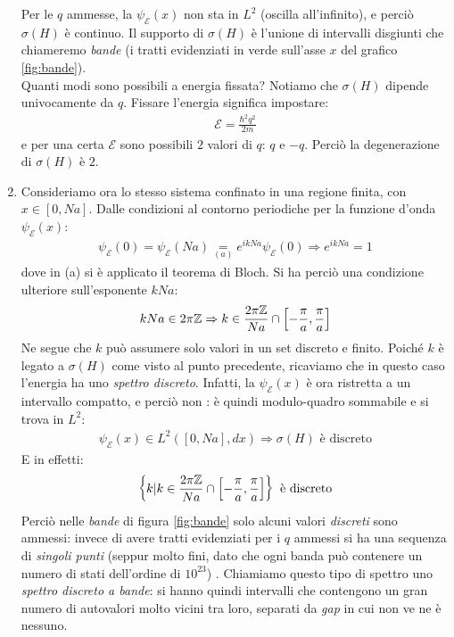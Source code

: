 \documentclass[../../FisicaTeorica.tex]{subfiles}
\begin{document}
\begin{enumerate}
Per le $q$ ammesse, la $\psi_\mathcal{E}(x)$ non sta in $L^2$ (oscilla all'infinito), e perciò $\sigma(H)$ è continuo. Il supporto di $\sigma(H)$ è l'unione di intervalli disgiunti
che chiameremo \textit{bande} (i tratti evidenziati in verde sull'asse $x$ del grafico \ref{fig:bande}).\\
Quanti modi sono possibili a energia fissata? Notiamo che $\sigma(H)$ dipende univocamente da $q$. Fissare l'energia significa impostare:
\begin{align*}
\mathcal{E} = \frac{\hbar^2 q^2}{2m}
\end{align*}
e per una certa $\mathcal{E}$ sono possibili $2$ valori di $q$: $q$ e $-q$. Perciò la degenerazione di $\sigma(H)$ è $2$.
\item Consideriamo ora lo stesso sistema confinato in una regione finita, con $x \in [0,Na]$. Dalle condizioni al contorno periodiche per la funzione d'onda $\psi_\mathcal{E}(x)$:
\begin{align*}
\psi_\mathcal{E}(0) = \psi_\mathcal{E}(Na) \underset{(a)}{=} e^{ikNa}\psi_\mathcal{E}(0) \Rightarrow e^{ikNa} = 1
\end{align*}
dove in (a) si è applicato il teorema di Bloch. Si ha perciò una condizione ulteriore sull'esponente $kNa$:
\begin{align*}
kNa \in 2\pi\mathbb{Z} \Rightarrow  k \in \frac{2\pi \mathbb{Z}}{Na}\cap \left[-\frac{\pi}{a}, \frac{\pi}{a}\right]
\end{align*}
Ne segue che $k$ può assumere solo valori in un set discreto e finito. Poiché $k$ è legato a $\sigma(H)$ come visto al punto precedente, ricaviamo che in questo caso l'energia ha uno \textit{spettro discreto}. Infatti, la $\psi_\mathcal{E}(x)$ è ora ristretta a un intervallo compatto, e perciò non : è quindi modulo-quadro sommabile e si trova in $L^2$:
\begin{align*}
\psi_\mathcal{E}(x) \in L^2([0,Na],dx) \Rightarrow \sigma(H) \text{ è discreto}
\end{align*}
E in effetti:
\begin{align*}
\left\{k | k \in \frac{2\pi\mathbb{Z}}{Na} \cap \left[-\frac{\pi}{a}, \frac{\pi}{a}\right] \right\} \text{ è discreto}
\end{align*}
Perciò nelle \textit{bande} di figura \ref{fig:bande} solo alcuni valori \textit{discreti} sono ammessi: invece di avere tratti evidenziati  per i $q$ ammessi si ha una sequenza di \textit{singoli punti} (seppur molto fini, dato che ogni banda può contenere un numero di stati dell'ordine di $10^{23}$) . Chiamiamo questo tipo di spettro uno \textit{spettro discreto a bande}: si hanno quindi intervalli  che contengono un gran numero di autovalori molto vicini tra loro, separati da \textit{gap} in cui non ve ne è nessuno.
\end{enumerate}
\end{document}
